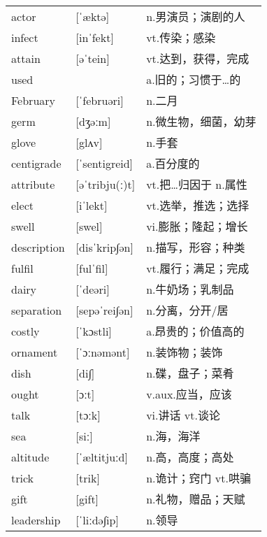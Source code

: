 \documentclass[a4paper]{article}
\begin{document}
\section{}
\begin{tabular}{l l l}

actor & [ˈæktə] & n.男演员；演剧的人 \\
infect & [inˈfekt] & vt.传染；感染 \\
attain & [əˈtein] & vt.达到，获得，完成 \\
used &  & a.旧的；习惯于…的 \\
February & [ˈfebruəri] & n.二月 \\
germ & [dʒəːm] & n.微生物，细菌，幼芽 \\
glove & [glʌv] & n.手套 \\
centigrade & [ˈsentigreid] & a.百分度的 \\
attribute & [əˈtribju(ː)t] & vt.把…归因于 n.属性 \\
elect & [iˈlekt] & vt.选举，推选；选择 \\
swell & [swel] & vi.膨胀；隆起；增长 \\
description & [disˈkrip∫ən] & n.描写，形容；种类 \\
fulfil & [fulˈfil] & vt.履行；满足；完成 \\
dairy & [ˈdeəri] & n.牛奶场；乳制品 \\
separation & [sepəˈrei∫ən] & n.分离，分开/居 \\
costly & [ˈkɔstli] & a.昂贵的；价值高的 \\
ornament & [ˈɔːnəmənt] & n.装饰物；装饰 \\
dish & [di∫] & n.碟，盘子；菜肴 \\
ought & [ɔːt] & v.aux.应当，应该 \\
talk & [tɔːk] & vi.讲话 vt.谈论 \\
sea & [siː] & n.海，海洋 \\
altitude & [ˈæltitjuːd] & n.高，高度；高处 \\
trick & [trik] & n.诡计；窍门 vt.哄骗 \\
gift & [gift] & n.礼物，赠品；天赋 \\
leadership & [ˈliːdə∫ip] & n.领导 \\

\end{tabular}
\end{document}
